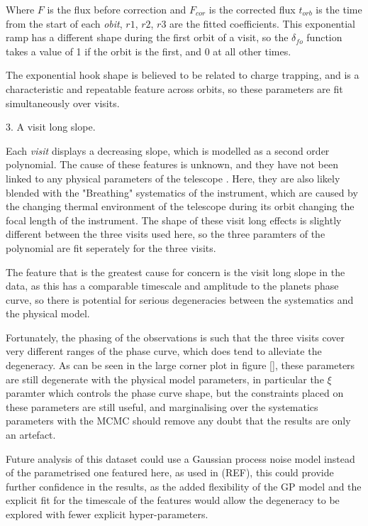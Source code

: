 \documentclass[a4paper,fleqn,usenatbib]{mnras}
\begin{document}
Where $F$ is the flux before correction and $F_{cor}$ is the corrected flux $t_{orb}$ is the time from the start of each \emph{obit}, $r1$, $r2$, $r3$ are the fitted coefficients. This exponential ramp has a different shape during the first orbit of a visit, so the $\delta_{fo}$ function takes a value of 1 if the orbit is the first, and 0 at all other times.

The exponential hook shape is believed to be related to charge trapping, and is a characteristic and repeatable feature across orbits, so these parameters are fit simultaneously over visits.

3. A visit long slope. 

Each \emph{visit} displays a decreasing slope, which is modelled as a second order polynomial. The cause of these features is unknown, and they have not been linked to any physical parameters of the telescope \cite{Wakeford2016}. Here, they are also likely blended with the "Breathing" systematics of the instrument, which are caused by the changing thermal environment of the telescope during its orbit changing the focal length of the instrument. The shape of these visit long effects is slightly different between the three visits used here, so the three paramters of the polynomial are fit seperately for the three visits.

The feature that is the greatest cause for concern is the visit long slope in the data, as this has a comparable timescale and amplitude to the planets phase curve, so there is potential for serious degeneracies between the systematics and the physical model.

Fortunately, the phasing of the observations is such that the three visits cover very different ranges of the phase curve, which does tend to alleviate the degeneracy. As can be seen in the large corner plot in figure \ref{}, these parameters are still degenerate with the physical model parameters, in particular the $\xi$ paramter which controls the phase curve shape, but the constraints placed on these parameters are still useful, and marginalising over the systematics parameters with the MCMC should remove any doubt that the results are only an artefact.

Future analysis of this dataset could use a Gaussian process noise model instead of the parametrised one featured here, as used in (REF), this could provide further confidence in the results, as the added flexibility of the GP model and the explicit fit for the timescale of the features would allow the degeneracy to be explored with fewer explicit hyper-parameters.
\end{document}
